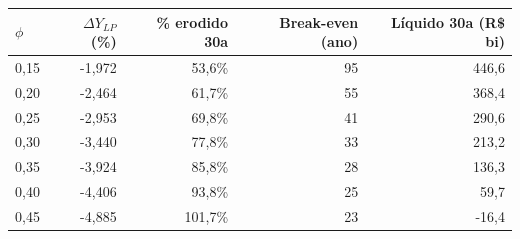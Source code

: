 \begin{tabular}{lrrrr}
\toprule
$\phi$ & $\Delta Y_{LP}$ (\%) & \% erodido 30a & Break-even (ano) & Líquido 30a (R\$ bi) \\
\midrule
0,15 & -1,972 & 53,6\% & 95 & 446,6 \\
0,20 & -2,464 & 61,7\% & 55 & 368,4 \\
0,25 & -2,953 & 69,8\% & 41 & 290,6 \\
0,30 & -3,440 & 77,8\% & 33 & 213,2 \\
0,35 & -3,924 & 85,8\% & 28 & 136,3 \\
0,40 & -4,406 & 93,8\% & 25 & 59,7 \\
0,45 & -4,885 & 101,7\% & 23 & -16,4 \\
\bottomrule
\end{tabular}
